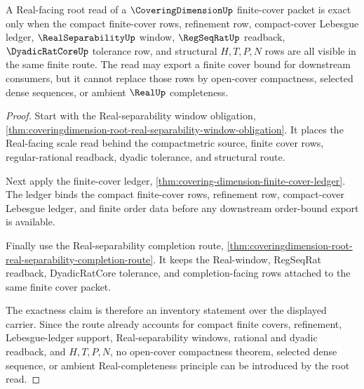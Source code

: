 \begin{theorem}
\label{thm:coveringdimension-root-finite-cover-real-window-exactness}
A Real-facing root read of a $\CoveringDimensionUp$ finite-cover packet is exact only when the compact finite-cover rows, refinement row, compact-cover Lebesgue ledger, $\RealSeparabilityUp$ window, $\RegSeqRatUp$ readback, $\DyadicRatCoreUp$ tolerance row, and structural $H,T,P,N$ rows are all visible in the same finite route. The read may export a finite cover bound for downstream consumers, but it cannot replace those rows by open-cover compactness, selected dense sequences, or ambient $\RealUp$ completeness.
\end{theorem}
\begin{proof}
Start with the Real-separability window obligation, \autoref{thm:coveringdimension-root-real-separability-window-obligation}. It places the Real-facing scale read behind the compactmetric source, finite cover rows, regular-rational readback, dyadic tolerance, and structural route.

Next apply the finite-cover ledger, \autoref{thm:covering-dimension-finite-cover-ledger}. The ledger binds the compact finite-cover rows, refinement row, compact-cover Lebesgue ledger, and finite order data before any downstream order-bound export is available.

Finally use the Real-separability completion route, \autoref{thm:coveringdimension-root-real-separability-completion-route}. It keeps the Real-window, RegSeqRat readback, DyadicRatCore tolerance, and completion-facing rows attached to the same finite cover packet.

The exactness claim is therefore an inventory statement over the displayed carrier. Since the route already accounts for compact finite covers, refinement, Lebesgue-ledger support, Real-separability windows, rational and dyadic readback, and $H,T,P,N$, no open-cover compactness theorem, selected dense sequence, or ambient Real-completeness principle can be introduced by the root read.
\end{proof}

